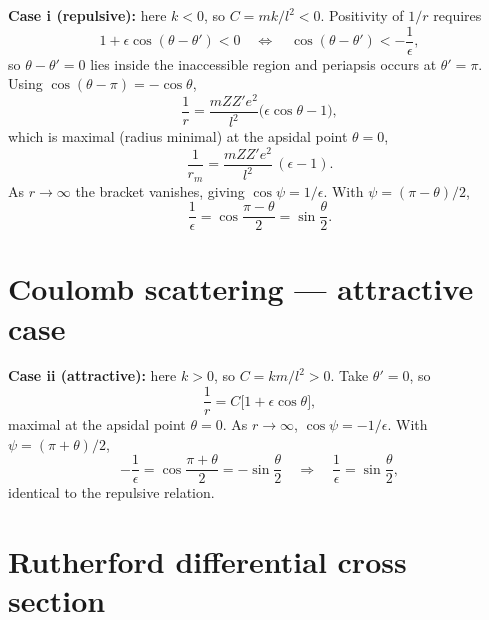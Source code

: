 \documentclass[11pt]{article}
\begin{document}
\textbf{Case i (repulsive):} here $k < 0$, so $C = mk/l^2 < 0$. Positivity of $1/r$
requires
\begin{equation}
  1 + \epsilon\cos(\theta - \theta') < 0
  \quad\Longleftrightarrow\quad
  \cos(\theta - \theta') < -\frac{1}{\epsilon},
\end{equation}
so $\theta - \theta' = 0$ lies inside the inaccessible region and periapsis occurs at
$\theta' = \pi$. Using $\cos(\theta - \pi) = -\cos\theta$,
\begin{equation}
  \frac{1}{r} = \frac{mZZ'e^2}{l^2}\bigl(\epsilon\cos\theta - 1\bigr),
\end{equation}
which is maximal (radius minimal) at the apsidal point $\theta = 0$,
\begin{equation}
  \frac{1}{r_m} = \frac{mZZ'e^2}{l^2}\,(\epsilon - 1).
\end{equation}
As $r \to \infty$ the bracket vanishes, giving $\cos\psi = 1/\epsilon$. With
$\psi = (\pi - \theta)/2$,
\begin{equation}
  \frac{1}{\epsilon} = \cos\frac{\pi-\theta}{2} = \sin\frac{\theta}{2}.
\end{equation}

\section{Coulomb scattering --- attractive case}

\textbf{Case ii (attractive):} here $k > 0$, so $C = km/l^2 > 0$. Take $\theta' = 0$, so
\begin{equation}
  \frac{1}{r} = C\bigl[1 + \epsilon\cos\theta\bigr],
\end{equation}
maximal at the apsidal point $\theta = 0$. As $r \to \infty$, $\cos\psi = -1/\epsilon$.
With $\psi = (\pi + \theta)/2$,
\begin{equation}
  -\frac{1}{\epsilon} = \cos\frac{\pi+\theta}{2} = -\sin\frac{\theta}{2}
  \quad\Longrightarrow\quad
  \frac{1}{\epsilon} = \sin\frac{\theta}{2},
\end{equation}
identical to the repulsive relation.

\section{Rutherford differential cross section}
\end{document}
